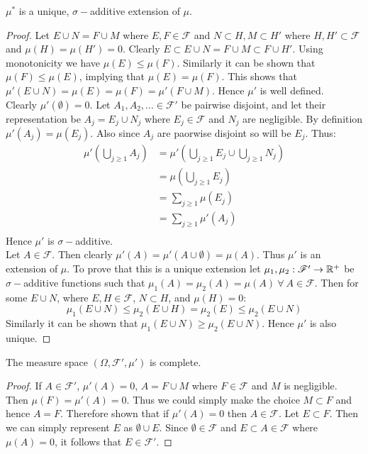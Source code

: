 \begin{proposition}
  $\mu^*$ is a unique, $\sigma-$additive extension of $\mu$.
\end{proposition}
\begin{proof}
  Let $E\cup N = F\cup M$ where $E,F\in \mathscr{F}$ and $N\subset H, M\subset H'$ where $H,H'\subset \mathscr{F}$ and $\mu(H) = \mu(H') =0$. Clearly $E \subset E\cup N = F\cup M \subset F\cup H'$. Using monotonicity we have $\mu(E)\leq \mu(F)$. Similarly it can be shown that $\mu(F)\leq \mu(E)$, implying that $\mu(E) = \mu(F)$. This shows that $\mu'(E\cup N) = \mu(E) = \mu(F) = \mu'(F\cup M)$. Hence $\mu'$ is well defined.\\

  Clearly $\mu'(\emptyset) = 0$. Let $A_1,A_2,...\in \mathscr{F}'$ be pairwise disjoint, and let their representation be $A_j = E_j \cup N_j$ where $E_j\in \mathscr{F}$ and $N_j$ are negligible. By definition $\mu'(A_j) = \mu(E_j)$. Also since $A_j$ are paorwise disjoint so will be $E_j$. Thus:
  \begin{align*}
    \mu'(\bigcup_{j\geq1}A_j) &= \mu'(\bigcup_{j\geq1} E_j\cup \bigcup_{j\geq1}N_j)\\
                     &= \mu(\bigcup_{j\geq1}E_j)\\
                     &= \sum_{j\geq1}\mu(E_j)\\
                     &= \sum_{j\geq1}\mu'(A_j)\\
  \end{align*}
  Hence $\mu'$ is $\sigma-$additive.\\

  Let $A \in \mathscr{F}$. Then clearly $\mu'(A) = \mu'(A\cup \emptyset) = \mu(A)$. Thus $\mu'$ is an extension of $\mu$. To prove that this is a unique extension let $\mu_1,\mu_2: \mathscr{F}' \to \mathbb{R}^+$ be $\sigma-$additive functions such that $\mu_1(A) = \mu_2(A) = \mu(A)\ \forall\ A\in \mathscr{F}$. Then for some $E\cup N$, where $E, H\in \mathscr{F}$, $N\subset H$, and $\mu(H) = 0$:
  \[\mu_1(E\cup N) \leq \mu_2(E\cup H) = \mu_2(E) \leq \mu_2(E\cup N)\]
  Similarly it can be shown that $\mu_1(E\cup N) \geq \mu_2(E\cup N)$. Hence $\mu'$ is also unique.
\end{proof}
\begin{proposition}
  The measure space $(\Omega, \mathscr{F}', \mu')$ is complete. 
\end{proposition}
\begin{proof}
  If $A\in \mathscr{F}'$, $\mu'(A)= 0$, $A = F\cup M$ where $F\in \mathscr{F}$ and $M$ is negligible. Then $\mu(F) = \mu'(A) =0$. Thus we could simply make the choice $M\subset F$ and hence $A=F$. Therefore shown that if $\mu'(A) = 0$ then $A\in \mathscr{F}$. Let $E\subset F$. Then we can simply represent $E$ as $\emptyset\cup E$. Since $\emptyset \in \mathscr{F}$ and $E \subset A \in \mathscr{F}$ where $\mu(A) = 0$, it follows that $E\in \mathscr{F}'$. 
\end{proof}

